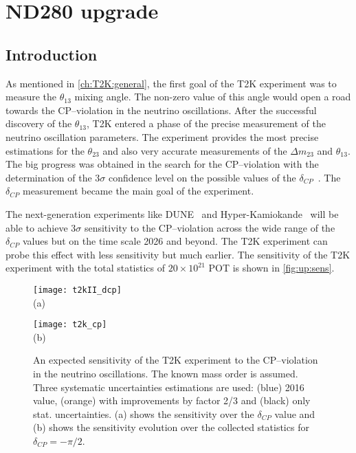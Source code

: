 \documentclass[../main.tex]{subfiles}
\begin{document}
\renewcommand{\labelitemi}{\ding{226}}
\renewcommand{\labelitemii}{\ding{227}}

\part{ND280 upgrade}
\label{pt:up}

\chapter{Introduction}
\label{ch:up:motif}
As mentioned in \autoref{ch:T2K:general}, the first goal of the T2K experiment was to measure the $\theta_{13}$ mixing angle. The non-zero value of this angle would open a road towards the CP--violation in the neutrino oscillations. After the successful discovery of the $\theta_{13}$, T2K entered a phase of the precise measurement of the neutrino oscillation parameters. The experiment provides the most precise estimations for the $\theta_{23}$ and also very accurate measurements of the $\Delta m_{23}$ and $\theta_{13}$. The big progress was obtained in the search for the CP--violation with the determination of the 3$\sigma$ confidence level on the possible values of the $\delta_{CP}$~\cite{Abe2020n}. The $\delta_{CP}$ measurement became the main goal of the experiment.

The next-generation experiments like DUNE~\cite{Acciarri2016} and Hyper-Kamiokande~\cite{Proto-Collaboration2018} will be able to achieve 3$\sigma$ sensitivity to the CP--violation across the wide range of the $\delta_{CP}$ values but on the time scale 2026 and beyond. The T2K experiment can probe this effect with less sensitivity but much earlier. The sensitivity of the T2K experiment with the total statistics of $20\times10^{21}$ POT is shown in \autoref{fig:up:sens}.

\begin{figure}[!ht]
  \centering
  \begin{minipage}{0.49\linewidth}
    \centering
    \texttt{[image: t2kII\_dcp]} \\ (a)
  \end{minipage}
  \begin{minipage}{0.49\linewidth}
    \centering
    \texttt{[image: t2k\_cp]} \\ (b)
  \end{minipage}
    \caption{An expected sensitivity of the T2K experiment to the CP--violation in the neutrino oscillations. The known mass order is assumed. Three systematic uncertainties estimations are used: (blue) 2016 value, (orange) with improvements by factor 2/3 and (black) only stat. uncertainties. (a) shows the sensitivity over the $\delta_{CP}$ value and (b) shows the sensitivity evolution over the collected statistics for $\delta_{CP}=-\pi/2$.}
    \label{fig:up:sens}
\end{figure}
\end{document}
